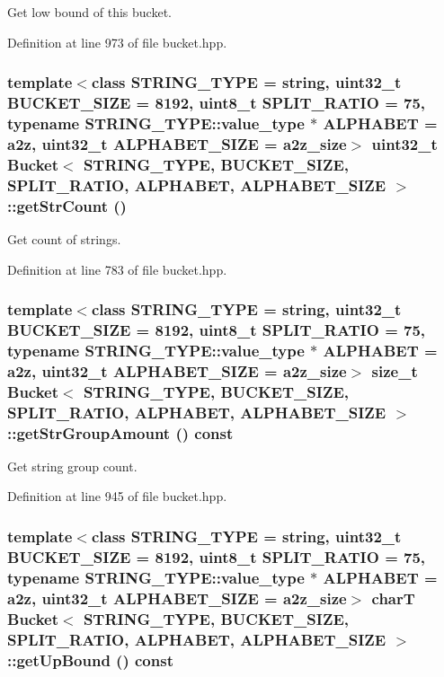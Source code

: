 Get low bound of this bucket. 

Definition at line 973 of file bucket.hpp.\hypertarget{classBucket_a857290e6bcc13c88f294661cb9b2443}{
\subsubsection[{getStrCount}]{\setlength{\rightskip}{0pt plus 5cm}template$<$class STRING\_\-TYPE  = string, uint32\_\-t BUCKET\_\-SIZE = 8192, uint8\_\-t SPLIT\_\-RATIO = 75, typename STRING\_\-TYPE::value\_\-type $\ast$ ALPHABET = a2z, uint32\_\-t ALPHABET\_\-SIZE = a2z\_\-size$>$ uint32\_\-t {\bf Bucket}$<$ STRING\_\-TYPE, BUCKET\_\-SIZE, SPLIT\_\-RATIO, ALPHABET, ALPHABET\_\-SIZE $>$::getStrCount ()}}
\label{classBucket_a857290e6bcc13c88f294661cb9b2443}


Get count of strings. 

Definition at line 783 of file bucket.hpp.\hypertarget{classBucket_7a6175d28ea21fa425d2b03b0591f543}{
\subsubsection[{getStrGroupAmount}]{\setlength{\rightskip}{0pt plus 5cm}template$<$class STRING\_\-TYPE  = string, uint32\_\-t BUCKET\_\-SIZE = 8192, uint8\_\-t SPLIT\_\-RATIO = 75, typename STRING\_\-TYPE::value\_\-type $\ast$ ALPHABET = a2z, uint32\_\-t ALPHABET\_\-SIZE = a2z\_\-size$>$ size\_\-t {\bf Bucket}$<$ STRING\_\-TYPE, BUCKET\_\-SIZE, SPLIT\_\-RATIO, ALPHABET, ALPHABET\_\-SIZE $>$::getStrGroupAmount () const}}
\label{classBucket_7a6175d28ea21fa425d2b03b0591f543}


Get string group count. 

Definition at line 945 of file bucket.hpp.\hypertarget{classBucket_bc2e307c528d04148b35e72561740773}{
\subsubsection[{getUpBound}]{\setlength{\rightskip}{0pt plus 5cm}template$<$class STRING\_\-TYPE  = string, uint32\_\-t BUCKET\_\-SIZE = 8192, uint8\_\-t SPLIT\_\-RATIO = 75, typename STRING\_\-TYPE::value\_\-type $\ast$ ALPHABET = a2z, uint32\_\-t ALPHABET\_\-SIZE = a2z\_\-size$>$ charT {\bf Bucket}$<$ STRING\_\-TYPE, BUCKET\_\-SIZE, SPLIT\_\-RATIO, ALPHABET, ALPHABET\_\-SIZE $>$::getUpBound () const}}
\label{classBucket_bc2e307c528d04148b35e72561740773}


